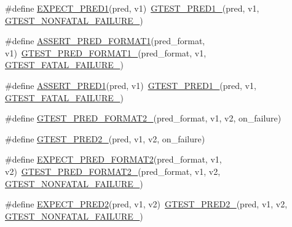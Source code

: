 \begin{DoxyCompactItemize}
\item 
\#define \hyperlink{fused-src_2gtest_2gtest_8h_a6d09aa83f8d297481380c7c073c9f070}{\-E\-X\-P\-E\-C\-T\-\_\-\-P\-R\-E\-D1}(pred, v1)~\hyperlink{gtest__pred__impl_8h_ad44cf322952076d85305bbdf39769ac1}{\-G\-T\-E\-S\-T\-\_\-\-P\-R\-E\-D1\-\_\-}(pred, v1, \hyperlink{gtest-internal_8h_a6cb7482cfa03661a91c698eb5895f642}{\-G\-T\-E\-S\-T\-\_\-\-N\-O\-N\-F\-A\-T\-A\-L\-\_\-\-F\-A\-I\-L\-U\-R\-E\-\_\-})
\item 
\#define \hyperlink{fused-src_2gtest_2gtest_8h_a3771ca0d1a72013aebc3d66e046491ed}{\-A\-S\-S\-E\-R\-T\-\_\-\-P\-R\-E\-D\-\_\-\-F\-O\-R\-M\-A\-T1}(pred\-\_\-format, v1)~\hyperlink{gtest__pred__impl_8h_aa3e3bfe04bb0e54d7f0e57e2f991d1eb}{\-G\-T\-E\-S\-T\-\_\-\-P\-R\-E\-D\-\_\-\-F\-O\-R\-M\-A\-T1\-\_\-}(pred\-\_\-format, v1, \hyperlink{gtest-internal_8h_a0f9a4c3ea82cc7bf4478eaffdc168358}{\-G\-T\-E\-S\-T\-\_\-\-F\-A\-T\-A\-L\-\_\-\-F\-A\-I\-L\-U\-R\-E\-\_\-})
\item 
\#define \hyperlink{fused-src_2gtest_2gtest_8h_a7d72f779b7d39b8f73a563ebc6d0604b}{\-A\-S\-S\-E\-R\-T\-\_\-\-P\-R\-E\-D1}(pred, v1)~\hyperlink{gtest__pred__impl_8h_ad44cf322952076d85305bbdf39769ac1}{\-G\-T\-E\-S\-T\-\_\-\-P\-R\-E\-D1\-\_\-}(pred, v1, \hyperlink{gtest-internal_8h_a0f9a4c3ea82cc7bf4478eaffdc168358}{\-G\-T\-E\-S\-T\-\_\-\-F\-A\-T\-A\-L\-\_\-\-F\-A\-I\-L\-U\-R\-E\-\_\-})
\item 
\#define \hyperlink{fused-src_2gtest_2gtest_8h_a115c18d1f752b7f091d577fb69cac372}{\-G\-T\-E\-S\-T\-\_\-\-P\-R\-E\-D\-\_\-\-F\-O\-R\-M\-A\-T2\-\_\-}(pred\-\_\-format, v1, v2, on\-\_\-failure)
\item 
\#define \hyperlink{fused-src_2gtest_2gtest_8h_ac560264104bd030b64034505d294a7b6}{\-G\-T\-E\-S\-T\-\_\-\-P\-R\-E\-D2\-\_\-}(pred, v1, v2, on\-\_\-failure)
\item 
\#define \hyperlink{fused-src_2gtest_2gtest_8h_af0141918615a5e2d5247e9cda8324dae}{\-E\-X\-P\-E\-C\-T\-\_\-\-P\-R\-E\-D\-\_\-\-F\-O\-R\-M\-A\-T2}(pred\-\_\-format, v1, v2)~\hyperlink{gtest__pred__impl_8h_a115c18d1f752b7f091d577fb69cac372}{\-G\-T\-E\-S\-T\-\_\-\-P\-R\-E\-D\-\_\-\-F\-O\-R\-M\-A\-T2\-\_\-}(pred\-\_\-format, v1, v2, \hyperlink{gtest-internal_8h_a6cb7482cfa03661a91c698eb5895f642}{\-G\-T\-E\-S\-T\-\_\-\-N\-O\-N\-F\-A\-T\-A\-L\-\_\-\-F\-A\-I\-L\-U\-R\-E\-\_\-})
\item 
\#define \hyperlink{fused-src_2gtest_2gtest_8h_a14e74e655e502914d3d07e083145ac91}{\-E\-X\-P\-E\-C\-T\-\_\-\-P\-R\-E\-D2}(pred, v1, v2)~\hyperlink{gtest__pred__impl_8h_ac560264104bd030b64034505d294a7b6}{\-G\-T\-E\-S\-T\-\_\-\-P\-R\-E\-D2\-\_\-}(pred, v1, v2, \hyperlink{gtest-internal_8h_a6cb7482cfa03661a91c698eb5895f642}{\-G\-T\-E\-S\-T\-\_\-\-N\-O\-N\-F\-A\-T\-A\-L\-\_\-\-F\-A\-I\-L\-U\-R\-E\-\_\-})

\end{DoxyCompactItemize}
